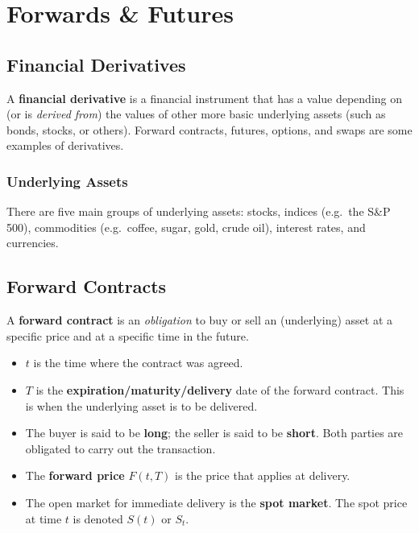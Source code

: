 \pagebreak
\section{Forwards \& Futures}

\subsection{Financial Derivatives}

\begin{definition}
  A \textbf{financial derivative} is a financial instrument that has a value depending on (or is \emph{derived from}) the values of other more basic underlying assets (such as bonds, stocks, or others). Forward contracts, futures, options, and swaps are some examples of derivatives.
\end{definition}

\subsubsection*{Underlying Assets}

There are five main groups of underlying assets: stocks, indices (e.g.\ the S\&P 500), commodities (e.g.\ coffee, sugar, gold, crude oil), interest rates, and currencies.

\subsection{Forward Contracts}

\begin{definition}
  A \textbf{forward contract} is an \emph{obligation} to buy or sell an (underlying) asset at a specific price and at a specific time in the future.
  \begin{itemize}
    \item $t$ is the time where the contract was agreed.
    \item $T$ is the \textbf{expiration/maturity/delivery} date of the forward contract. This is when the underlying asset is to be delivered.
    \item The buyer is said to be \textbf{long}; the seller is said to be \textbf{short}. Both parties are obligated to carry out the transaction.
    \item The \textbf{forward price} $F(t,T)$ is the price that applies at delivery.
    \item The open market for immediate delivery is the \textbf{spot market}. The spot price at time $t$ is denoted $S(t)$ or $S_t$.
  \end{itemize}
\end{definition}

